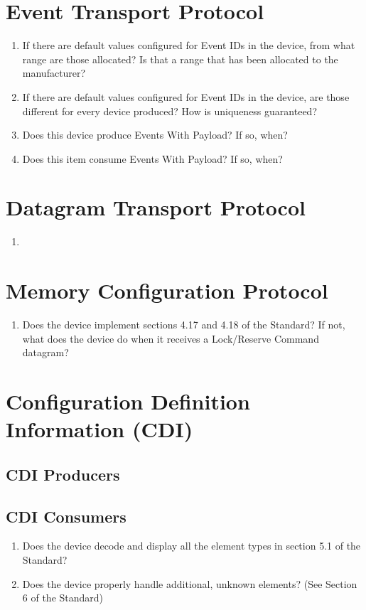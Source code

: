 \section{Event Transport Protocol}
\begin{enumerate}
    \item If there are default values configured for Event IDs in the device,
        from what range are those allocated? Is that a range that has been
        allocated to the manufacturer?
    \item  If there are default values configured for Event IDs in the device,
        are those different for every device produced? How is uniqueness
        guaranteed?
    \item Does this device produce Events With Payload?  If so, when?
    \item Does this item consume Events With Payload?  If so, when?
\end{enumerate}

\section{Datagram Transport Protocol}
\begin{enumerate}
    \item 
\end{enumerate}

\section{Memory Configuration Protocol}
\begin{enumerate}
    \item Does the device implement sections 4.17 and 4.18 of the Standard?
          If not, what does the device do when it receives a Lock/Reserve Command 
          datagram?
\end{enumerate}

\section{Configuration Definition Information (CDI)}
\subsection{CDI Producers}

\subsection{CDI Consumers}
\begin{enumerate}
    \item Does the device decode and display all the element types in section 
            5.1 of the Standard?
    \item Does the device properly handle additional, unknown elements? 
            (See Section 6 of the Standard)
\end{enumerate}


